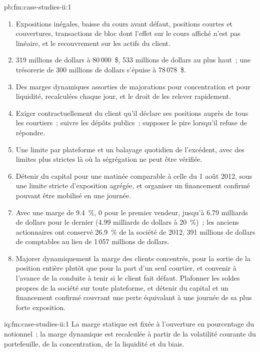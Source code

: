 \begin{solution}{pb:fm:case-studies-ii:1}
\begin{enumerate}
\item Expositions inégales, baisse du cours avant défaut, positions courtes et couvertures, transactions de bloc dont l'effet sur le cours affiché n'est pas linéaire, et
le recouvrement sur les actifs du client.
\item 319 millions de dollars à 80\,000~\$, 533 millions de dollars au plus haut~; une trésorerie de 300 millions de dollars s'épuise à 78\,078~\$.
\item Des marges dynamiques assorties de majorations pour concentration et pour liquidité, recalculées chaque jour, et le droit de les relever rapidement.
\item Exiger contractuellement du client qu'il déclare ses positions auprès de tous les courtiers~; suivre les dépôts publics~; supposer le pire lorsqu'il refuse de répondre.
\item Une limite par plateforme et un balayage quotidien de l'excédent, avec des limites plus strictes là où la ségrégation ne peut être vérifiée.
\item Détenir du capital pour une matinée comparable à celle du 1 août 2012, sous une limite stricte d'exposition agrégée, et organiser un financement confirmé pouvant être mobilisé en une journée.
\item Avec une marge de 9.4~\%, 0 pour le premier vendeur, jusqu'à 6.79 milliards de dollars pour le dernier (4.99 milliards de dollars à 20~\%)~; les anciens actionnaires ont conservé 26.9~\% de la
société de 2012, 391 millions de dollars de  comptables au lieu de 1\,057 millions de dollars.
\item Majorer dynamiquement la marge des clients concentrés, pour la sortie de la position entière plutôt que pour la part d'un seul courtier, et convenir à l'avance de la conduite à tenir si le
client fait défaut. Plafonner les soldes propres de la société sur toute plateforme, et détenir du capital et un financement confirmé couvrant une perte équivalant à une journée de sa plus forte exposition.
\end{enumerate}
\end{solution}

\begin{solution}{iq:fm:case-studies-ii:1}
La marge statique est fixée à l'ouverture en pourcentage du notionnel~; la marge dynamique est recalculée à partir de la volatilité courante du portefeuille,
de la concentration, de la liquidité et du biais.
\end{solution}

